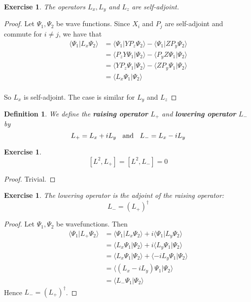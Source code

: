 \documentclass[12pt]{amsart}
\newtheorem{defn}[thm]{Definition}
\newtheorem{ex}[thm]{Exercise}
\renewcommand{\r}{\rangle}
\renewcommand{\l}{\langle}
\begin{document}
\begin{ex} The operators $L_x,L_y$ and $L_z$ are self-adjoint.
\end{ex}

\begin{proof} Let $\Psi_1, \Psi_2$ be wave functions. Since $X_i$ and $P_j$ are self-adjoint and commute for $i \neq j$, we have that
\begin{align*}
\l \Psi_1 \vert L_x \Psi_2\r
&= \l \Psi_1 \vert YP_z \Psi_2\r - \l \Psi_1 \vert ZP_y \Psi_2\r\\
&= \l P_zY\Psi_1 \vert  \Psi_2\r - \l P_yZ \Psi_1 \vert \Psi_2\r \\
&= \l YP_z \Psi_1 \vert  \Psi_2\r - \l ZP_y \Psi_1 \vert \Psi_2\r \\
&= \l L_x\Psi_1 \vert \Psi_2\r 
\end{align*} \\
So $L_x$ is self-adjoint. The case is similar for $L_y$ and $L_z$
\end{proof}

\begin{defn}
We define the \textbf{raising operator} $L_+$ and \textbf{lowering operator} $L_-$ by $$L_+ = L_x +iL_y \hspace{2mm}\text{ and } \hspace{2mm} L_- = L_x - iL_y$$
\end{defn}

\begin{ex}
$$[L^2, L_+] = [L^2,L_-] = 0$$
\end{ex}

\begin{proof}
Trivial.
\end{proof}

\begin{ex}
The lowering operator is the adjoint of the raising operator: $$L_- = (L_+)^{\dagger}$$
\end{ex}

\begin{proof} Let $\Psi_1, \Psi_2$ be wavefunctions. Then 
\begin{align*}
\l \Psi_1 \vert L_+ \Psi_2 \r
&=  \l \Psi_1 \vert L_x \Psi_2 \r + i\l \Psi_1 \vert L_y \Psi_2 \r \\
&= \l L_x \Psi_1 \vert \Psi_2 \r + i\l L_y \Psi_1 \vert  \Psi_2 \r \\
&= \l L_x \Psi_1 \vert \Psi_2 \r + \l -i L_y \Psi_1 \vert  \Psi_2 \r \\
&= \l (L_x -iL_y)\Psi_1 \vert \Psi_2 \r\\
&= \l L_- \Psi_1 \vert \Psi_2 \r
\end{align*}
Hence $L_- = (L_+)^{\dagger}$.
\end{proof}
\end{document}

